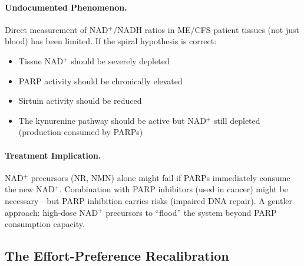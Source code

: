 \paragraph{Undocumented Phenomenon.} Direct measurement of NAD$^+$/NADH ratios in ME/CFS patient tissues (not just blood) has been limited. If the spiral hypothesis is correct:
\begin{itemize}
    \item Tissue NAD$^+$ should be severely depleted
    \item PARP activity should be chronically elevated
    \item Sirtuin activity should be reduced
    \item The kynurenine pathway should be active but NAD$^+$ still depleted (production consumed by PARPs)
\end{itemize}

\paragraph{Treatment Implication.} NAD$^+$ precursors (NR, NMN) alone might fail if PARPs immediately consume the new NAD$^+$. Combination with PARP inhibitors (used in cancer) might be necessary---but PARP inhibition carries risks (impaired DNA repair). A gentler approach: high-dose NAD$^+$ precursors to ``flood'' the system beyond PARP consumption capacity.

\subsection{The Effort-Preference Recalibration}

